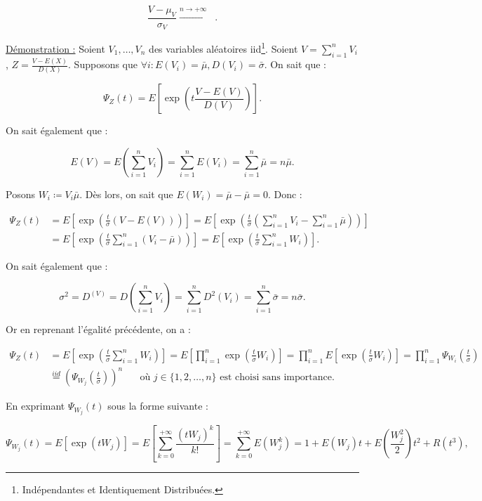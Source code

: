 \documentclass{article}
\DeclareMathOperator{\Nzo}{\mathcal N(0, 1)}
\begin{document}
		\[\frac {V - \mu_V}{\sigma_V} \stackrel{n \to +\infty}{\longrightarrow} \Nzo.\]

		\underline{Démonstration :} Soient $V_1, \ldots, V_n$ des variables aléatoires iid\footnote{Indépendantes et Identiquement Distribuées.}. Soient $V = \sum_{i=1}^nV_i$,
		$Z = \frac {V - E(X)}{D(X)}$. Supposons que $\forall i : E(V_i) = \bar \mu, D(V_i) = \bar \sigma$. On sait que :

		\[\Psi_Z(t) = E\left[\exp\left(t\frac {V-E(V)}{D(V)}\right)\right].\]

		On sait également que :
	
		\[E(V) = E\left(\sum_{i=1}^nV_i\right) = \sum_{i=1}^nE(V_i) = \sum_{i=1}^n\bar \mu = n\bar \mu.\]

		Posons $W_i \coloneqq V_i  \bar \mu$. Dès lors, on sait que $E(W_i) = \bar \mu - \bar \mu = 0$. Donc :

		\begin{align*}
			\Psi_Z(t) &= E\left[ \exp\left(\frac t\sigma(V-E(V))\right) \right] = E\left[ \exp\left(\frac t\sigma \left(\sum_{i=1}^nV_i - \sum_{i=1}^n\bar\mu\right)\right) \right] \\
	                  &= E\left[ \exp\left(\frac t\sigma \sum_{i=1}^n(V_i-\bar\mu)\right) \right] = E\left[ \exp\left(\frac t\sigma\sum_{i=1}^nW_i\right) \right].
		\end{align*}
	
		On sait également que :

		\[\sigma^2 = D^(V) = D\left(\sum_{i=1}^nV_i\right) = \sum_{i=1}^nD^2(V_i) = \sum_{i=1}^n\bar\sigma = n\bar\sigma.\]

		Or en reprenant l'égalité précédente, on a :

		\begin{align*}
			\Psi_Z(t) &= E\left[ \exp\left(\frac t\sigma \sum_{i=1}^nW_i\right) \right] = E\left[ \prod_{i=1}^n\exp\left(\frac t\sigma W_i\right) \right] =
			\prod_{i=1}^nE\left[ \exp\left(\frac t\sigma W_i\right) \right] = \prod_{i=1}^n\Psi_{W_i}\left(\frac t\sigma\right) \\
		              &\stackrel{iid}= \left(\Psi_{W_j}\left(\frac t\sigma\right)\right)^n \;\;\;\;\;\text{ où $j \in \{1, 2, \ldots, n\}$ est choisi sans importance}.
		\end{align*}

		En exprimant $\Psi_{W_j}(t)$ sous la forme suivante :

		\[\Psi_{W_j}(t) = E[\exp(tW_j)] = E\left[\sum_{k=0}^{+\infty}\frac {(tW_j)^k}{k!}\right] = \sum_{k=0}^{+\infty}E(W_j^k) = 1 + E(W_j)t + E\left(\frac {W_j^2}2\right)t^2 + R(t^3),\]
\end{document}
